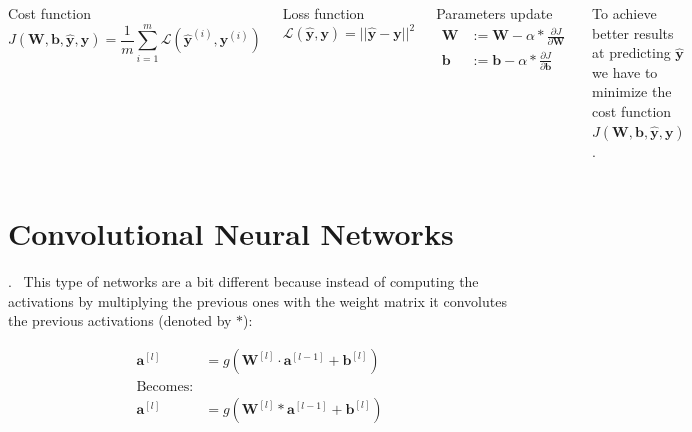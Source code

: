 \documentclass[xcolor={x11names, table}, compress]{beamer}
\newcommand{\insertsec}{\thesection.~\insertsection}
\begin{document}
\begin{frame}
    \begin{columns}
        \begin{block}{Cost function}
            $$
            J(\bm{W}, \bm{b}, \hat{\bm{y}}, \bm{y}) = 
            \frac{1}{m} \sum_{i=1}^{m} \mathcal{L}(\hat{\bm{y}}^{(i)}, \bm{y}^{(i)})
            $$
        \end{block}
        \begin{block}{Loss function}
            $$
            \mathcal{L}(\hat{\bm{y}}, \bm{y}) = ||\hat{\bm{y}} - \bm{y}||^2
            $$
        \end{block}
        \begin{block}{Parameters update}
            \begin{align*}
            \bm{W} &:= \bm{W} - \alpha*\frac{\partial J}{\partial \bm{W}} \\
            \bm{b} &:= \bm{b} - \alpha*\frac{\partial J}{\partial \bm{b}}
            \end{align*}
        \end{block}
        To achieve better results at predicting $\hat{\bm{y}}$ 
        we have to minimize the cost function $J(\bm{W}, \bm{b}, \hat{\bm{y}}, \bm{y})$.
    \end{columns}
\end{frame}

\section{Convolutional Neural Networks}
\begin{frame}{\insertsec}
    This type of networks are a bit different because instead of computing the activations by
    multiplying the previous ones with the weight matrix it convolutes the previous activations 
    (denoted by $*$):
    
    \begin{align*}
        \bm{a}^{[l]} &= g(\bm{W}^{[l]}\cdot \bm{a}^{[l - 1]} + \bm{b}^{[l]}) \\
        \text{Becomes:} \\
        \bm{a}^{[l]} &= g(\bm{W}^{[l]} * \bm{a}^{[l-1]} + \bm{b}^{[l]})
    \end{align*}
\end{frame}
\end{document}
